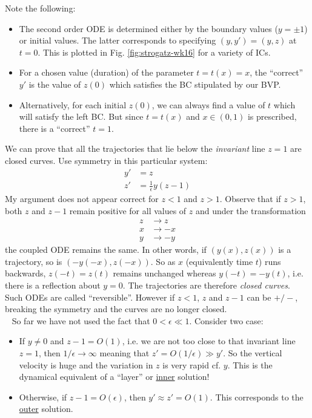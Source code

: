 Note the following:
\begin{itemize}
	\item The second order ODE is determined either by the boundary values ($y=\pm 1$) or initial values. The latter corresponds to specifying $(y,y') = (y,z)$ at $t=0$.  This is plotted in Fig. \ref{fig:strogatz-wk16} for a variety of ICs.
	\item For a chosen value (duration) of the parameter $t=t(x)=x$, the ``correct'' $y'$ is the value of $z(0)$ which satisfies the BC stipulated by our BVP.
	\item Alternatively, for each initial $z(0)$, we can always find a value of $t$ which will satisfy the left BC. But since $t=t(x)$ and $x \in (0,1)$ is prescribed, there is a ``correct'' $t=1$.
\end{itemize}
We can prove that all the trajectories that lie below the \emph{invariant} line $z=1$ are closed curves. Use symmetry in this particular system:
\begin{align*}
	y' &= z \\
	z' &= \frac{1}{\epsilon} y (z-1)
\end{align*}
{\color{red} My argument does not appear correct for $z<1$ and $z>1$.} Observe that if $z>1$, both $z$ and $z-1$ remain positive for all values of $z$ and under the transformation
\begin{align*}
	z &\rightarrow z \\
	x &\rightarrow -x \\
	y &\rightarrow -y
\end{align*}
the coupled ODE remains the same. In other words, if $(y(x),z(x))$ is a trajectory, so is $(-y(-x),z(-x))$. So as $x$ (equivalently time $t$) runs backwards, $z(-t)=z(t)$ remains unchanged whereas $y(-t) = -y(t)$, i.e. there is a reflection about $y=0$. The trajectories are therefore \emph{closed curves}. Such ODEs are called ``reversible''. However if $ z<1$, $z$ and $z-1$ can be $+/-$, breaking the symmetry and the curves are no longer closed. \\
\ \newline
So far we have not used the fact that $0 <\epsilon \ll 1$. Consider two case:
\begin{itemize}
	\item If $y \neq 0$ and $z-1 = O(1)$, i.e. we are not too close to that invariant line $z=1$, then $1/\epsilon \rightarrow \infty$ meaning that $z'=O(1/\epsilon) \gg y'$. So the vertical velocity is huge and the variation in $z$ is very rapid cf. $y$. This is the dynamical equivalent of a ``layer'' or \underline{inner} solution!
	\item Otherwise, if $z-1=O(\epsilon)$, then $y' \approx z'=O(1)$. This corresponds to the \underline{outer} solution.
\end{itemize}  
